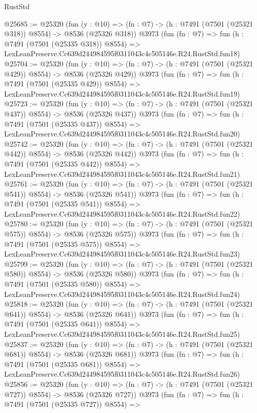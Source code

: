 \begin{lexlean}{RustStd}
\begin{coremodule}
@25685 := @25320
    (fun (y : @10) => (fn : @7) -> (h : @7491 (@7501 (@25321 @318)) @8554) -> @8536 (@25326 @318))
    @3973
    (fun (fn : @7) =>
    fun (h : @7491 (@7501 (@25335 @318)) @8554) =>
    LexLeanPreserve.Cc639d244984595f0311043c4c505146e.R24.RustStd.fun18)
@25704 := @25320
    (fun (y : @10) => (fn : @7) -> (h : @7491 (@7501 (@25321 @429)) @8554) -> @8536 (@25326 @429))
    @3973
    (fun (fn : @7) =>
    fun (h : @7491 (@7501 (@25335 @429)) @8554) =>
    LexLeanPreserve.Cc639d244984595f0311043c4c505146e.R24.RustStd.fun19)
@25723 := @25320
    (fun (y : @10) => (fn : @7) -> (h : @7491 (@7501 (@25321 @437)) @8554) -> @8536 (@25326 @437))
    @3973
    (fun (fn : @7) =>
    fun (h : @7491 (@7501 (@25335 @437)) @8554) =>
    LexLeanPreserve.Cc639d244984595f0311043c4c505146e.R24.RustStd.fun20)
@25742 := @25320
    (fun (y : @10) => (fn : @7) -> (h : @7491 (@7501 (@25321 @442)) @8554) -> @8536 (@25326 @442))
    @3973
    (fun (fn : @7) =>
    fun (h : @7491 (@7501 (@25335 @442)) @8554) =>
    LexLeanPreserve.Cc639d244984595f0311043c4c505146e.R24.RustStd.fun21)
@25761 := @25320
    (fun (y : @10) => (fn : @7) -> (h : @7491 (@7501 (@25321 @541)) @8554) -> @8536 (@25326 @541))
    @3973
    (fun (fn : @7) =>
    fun (h : @7491 (@7501 (@25335 @541)) @8554) =>
    LexLeanPreserve.Cc639d244984595f0311043c4c505146e.R24.RustStd.fun22)
@25780 := @25320
    (fun (y : @10) => (fn : @7) -> (h : @7491 (@7501 (@25321 @575)) @8554) -> @8536 (@25326 @575))
    @3973
    (fun (fn : @7) =>
    fun (h : @7491 (@7501 (@25335 @575)) @8554) =>
    LexLeanPreserve.Cc639d244984595f0311043c4c505146e.R24.RustStd.fun23)
@25799 := @25320
    (fun (y : @10) => (fn : @7) -> (h : @7491 (@7501 (@25321 @580)) @8554) -> @8536 (@25326 @580))
    @3973
    (fun (fn : @7) =>
    fun (h : @7491 (@7501 (@25335 @580)) @8554) =>
    LexLeanPreserve.Cc639d244984595f0311043c4c505146e.R24.RustStd.fun24)
@25818 := @25320
    (fun (y : @10) => (fn : @7) -> (h : @7491 (@7501 (@25321 @641)) @8554) -> @8536 (@25326 @641))
    @3973
    (fun (fn : @7) =>
    fun (h : @7491 (@7501 (@25335 @641)) @8554) =>
    LexLeanPreserve.Cc639d244984595f0311043c4c505146e.R24.RustStd.fun25)
@25837 := @25320
    (fun (y : @10) => (fn : @7) -> (h : @7491 (@7501 (@25321 @681)) @8554) -> @8536 (@25326 @681))
    @3973
    (fun (fn : @7) =>
    fun (h : @7491 (@7501 (@25335 @681)) @8554) =>
    LexLeanPreserve.Cc639d244984595f0311043c4c505146e.R24.RustStd.fun26)
@25856 := @25320
    (fun (y : @10) => (fn : @7) -> (h : @7491 (@7501 (@25321 @727)) @8554) -> @8536 (@25326 @727))
    @3973
    (fun (fn : @7) =>
    fun (h : @7491 (@7501 (@25335 @727)) @8554) =>

\end{coremodule}
\end{lexlean}
